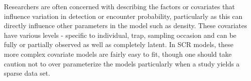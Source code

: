 Researchers are often concerned with describing the factors or covariates that influence
variation in detection or encounter probability, particularly as this can directly influence
other parameters in the model such as density.  These covariates have various levels - specific
to individual, trap, sampling occasion and can be fully or partially observed as well as 
completely latent.  In SCR models, these more complex covariate models are fairly easy to fit, 
though one should take caution not to over parameterize the models
particularly when a study yields a sparse data set.


\begin{comment}

Different detection models: We can make up detection models {\it all fucking
day}, to no end, with no point, and with no biological justification for
any single model. To us this would be bad practice and so we think it is
perfectly fine to pick a model ahead of time and stick with it.

we note that underlying these different models is basically something
to do with the 2nd moment structure of some correlated spatial process...
i.e., correlation functions (Higdon et al. 1998; etc...) and , insofar
as choosing detection functions is like choosing a correlation function,
it probably wont have much affect on inferences.
\end{comment}


\begin{comment}
XXXX Andy sez: probably not -- we can stop here at a basic
description of the models XXXX

XXX Andy, do you still think this is necessary? XXX
It is interesting to consider alternative distributions for $\alpha_{1,i}$, here we 
use a Normal prior which might result in a negative value for $\alpha_{1,i}$ which is
not expected but also not entirely nonsensical.  We could also use the the Inverse-Gamma
distribution, but it is not conjugate in the present context and so
there is no compelling reason to do that.  Also important to note is that if A[i] 
is the home range area of individual $i$, and we have related area to $\sigma$ through a specified
function, then we can move back and forth between distributions for
A[i], $\sigma_i$, and $\alpha_{1,i}$.


{\bf Approximation: }
Note that ``SCR + Mh'' might be a good approximation to ``SCR + Ah''.  If we write $\alpha_{1,i} =
\alpha_{1} + \eta_{i}$ then
we can take the expectation over  $\alpha_{i}$ to arrive at
\[
\mbox{logit}(p0) = \alpha_0 
p_{ijk} = p0 \exp(- \alpha_{1}*||{\bf s}_{i}-{\bf x}_{j}||^2) +  \eta_{i}*||{\bf s}_{i}-{\bf x}_{j}||^2)
\]

Which has this additive individual effect that varies also by trap. It might be that approximating
this by SCR+Mh is better than nothing and it could also be viewed as suggesting an 
over-dispersed count model for encounter frequencies.

XXXXXXXXXXXXXXXXX above commented out 

\end{comment}